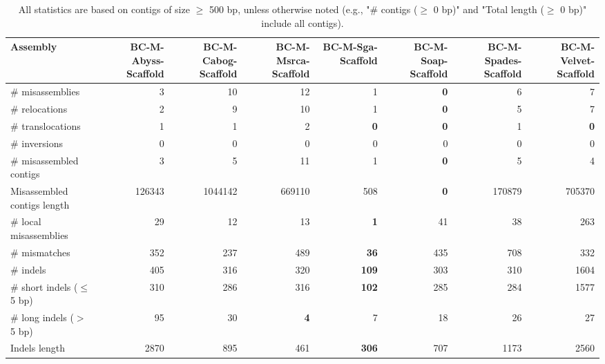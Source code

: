 \documentclass[12pt,a4paper]{article}
\begin{document}
\begin{table}[ht]
\begin{center}
\caption{All statistics are based on contigs of size $\geq$ 500 bp, unless otherwise noted (e.g., "\# contigs ($\geq$ 0 bp)" and "Total length ($\geq$ 0 bp)" include all contigs).}
\begin{tabular}{|l*{7}{|r}|}
\hline
Assembly & BC-M-Abyss-Scaffold & BC-M-Cabog-Scaffold & BC-M-Msrca-Scaffold & BC-M-Sga-Scaffold & BC-M-Soap-Scaffold & BC-M-Spades-Scaffold & BC-M-Velvet-Scaffold \\ \hline
\# misassemblies & 3 & 10 & 12 & 1 & {\bf 0} & 6 & 7 \\ \hline
\hspace{5mm}\# relocations & 2 & 9 & 10 & 1 & {\bf 0} & 5 & 7 \\ \hline
\hspace{5mm}\# translocations & 1 & 1 & 2 & {\bf 0} & {\bf 0} & 1 & {\bf 0} \\ \hline
\hspace{5mm}\# inversions & 0 & 0 & 0 & 0 & 0 & 0 & 0 \\ \hline
\# misassembled contigs & 3 & 5 & 11 & 1 & {\bf 0} & 5 & 4 \\ \hline
Misassembled contigs length & 126343 & 1044142 & 669110 & 508 & {\bf 0} & 170879 & 705370 \\ \hline
\# local misassemblies & 29 & 12 & 13 & {\bf 1} & 41 & 38 & 263 \\ \hline
\# mismatches & 352 & 237 & 489 & {\bf 36} & 435 & 708 & 332 \\ \hline
\# indels & 405 & 316 & 320 & {\bf 109} & 303 & 310 & 1604 \\ \hline
\hspace{5mm}\# short indels ($\leq$ 5 bp) & 310 & 286 & 316 & {\bf 102} & 285 & 284 & 1577 \\ \hline
\hspace{5mm}\# long indels ($>$ 5 bp) & 95 & 30 & {\bf 4} & 7 & 18 & 26 & 27 \\ \hline
Indels length & 2870 & 895 & 461 & {\bf 306} & 707 & 1173 & 2560 \\ \hline
\end{tabular}
\end{center}
\end{table}
\end{document}
